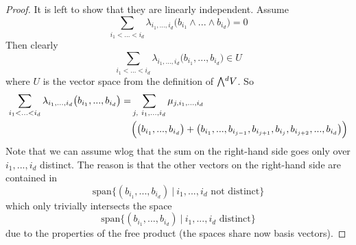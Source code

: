 \documentclass{scrartcl}
\newcommand{\extpow}{\mathchoice{{\textstyle\bigwedge}}
    {{\bigwedge}}
    {{\textstyle\wedge}}
    {{\scriptstyle\wedge}}}
\newcommand{\vspan}{\mathrm{span}}
\theoremstyle{definition}
\begin{document}
\begin{proof}
    It is left to show that they are linearly independent.
    Assume
    \begin{equation*}
        \sum_{i_1 < ... < i_d} \lambda_{i_1, ..., i_d} \bigl( b_{i_1} \wedge ... \wedge b_{i_d} \bigr) = 0
    \end{equation*}
    Then clearly
    \begin{equation*}
        \sum_{i_1 < ... < i_d} \lambda_{i_1, ..., i_d} \bigl( b_{i_1}, ..., b_{i_d} \bigr) \in U
    \end{equation*}
    where $U$ is the vector space from the definition of $\extpow^d V$.
    So
    \begin{align*}
        \sum_{i_1 < ... < i_d} \lambda_{i_1, ..., i_d} \bigl( b_{i_1}, ..., b_{i_d} \bigr) = &\sum_{j, \ i_1, ..., i_d} \mu_{j, i_1, ..., i_d} \\
        &\Bigl( \bigl( b_{i_1}, ..., b_{i_d} \bigr) + \bigl( b_{i_1}, ..., b_{i_{j - 1}}, b_{i_{j + 1}}, b_{i_j}, b_{i_{j + 2}}, ..., b_{i_d} \bigr) \Bigr)
    \end{align*}
    Note that we can assume wlog that the sum on the right-hand side goes only over $i_1, ..., i_d$ distinct.
    The reason is that the other vectors on the right-hand side are contained in
    \begin{equation*}
       \vspan \{ (b_{i_1}, ..., b_{i_d}) \ | \ \text{$i_1, ..., i_d$ not distinct} \}
    \end{equation*}
    which only trivially intersects the space
    \begin{equation*}
        \vspan\{ (b_{i_1}, ..., b_{i_d}) \ | \ \text{$i_1, ..., i_d$ distinct} \}
    \end{equation*}
    due to the properties of the free product (the spaces share now basis vectors).


\end{proof}
\end{document}
